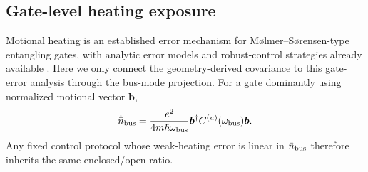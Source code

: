 \documentclass[aps,pra,twocolumn,superscriptaddress,longbibliography,nofootinbib,floatfix]{revtex4-2}
\theoremstyle{remark}
\begin{document}
\subsection{Gate-level heating exposure}
\label{sec:gate}

Motional heating is an established error mechanism for M\o lmer--S\o rensen-type entangling gates, with analytic error models and robust-control strategies already available \cite{Webb2018,Sutherland2022,Kang2023}.  Here we only connect the geometry-derived covariance to this gate-error analysis through the bus-mode projection.  For a gate dominantly using normalized motional vector $\bm b$,
\begin{equation}
\dot{\bar n}_{\rm bus}=\frac{e^2}{4m\hbar\omega_{\rm bus}}
\bm b^\dagger C^{(u)}(\omega_{\rm bus})\bm b.
\label{eq:busheat}
\end{equation}
Any fixed control protocol whose weak-heating error is linear in $\dot{\bar n}_{\rm bus}$ therefore inherits the same enclosed/open ratio.
\end{document}
